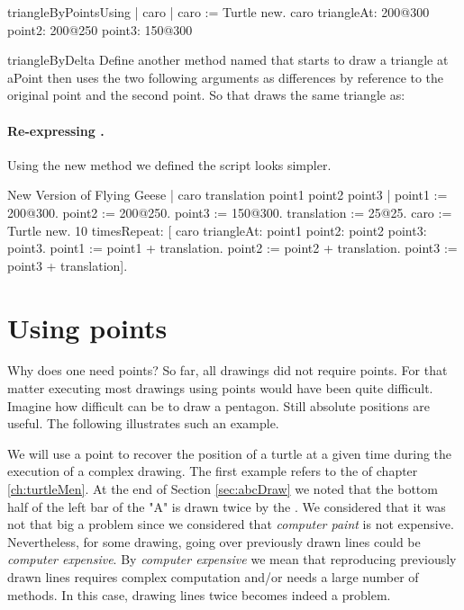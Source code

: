 \begin{scriptfig}{triangleByPoints}{Using }\label{scr:triangleUse}
| caro |
caro := Turtle new.
caro  
   triangleAt: 200@300 
   point2: 200@250 
   point3: 150@300 
\end{scriptfig}

\begin{exofig}{triangleByDelta}
Define another method named  that starts to draw a triangle at aPoint then uses the two following arguments as differences by reference to the original point and the second point.
So that  draws the same triangle as: 
\end{exofig}


\paragraph{Re-expressing .}
Using the new method we defined the script looks simpler. 

\begin{scriptwithtitle}{New Version of Flying Geese}\label{scr:newflyinggeese}
| caro translation point1 point2 point3 |
point1 := 200@300.
point2 := 200@250.
point3 := 150@300.
translation := 25@25.
caro := Turtle new.
10 timesRepeat: [
	caro triangleAt: point1 point2: point2 point3: point3.
       point1 := point1 + translation.
       point2 := point2 + translation.
       point3 := point3 + translation].
\end{scriptwithtitle}



\section{Using points}
Why does one need points? So far, all drawings did not require points. 
For that matter executing most drawings using points
would have been quite difficult. Imagine how difficult can be  to draw a pentagon. 
Still absolute positions are useful. The following illustrates such an example. 

We will use a point to recover the position of a turtle at a given time during the 
execution of a complex drawing. The first example refers to the  of
chapter \ref{ch:turtleMen}. At the end of Section \ref{sec:abcDraw} we noted that the bottom
half of the left bar of the "A" is drawn twice by the 
. We considered that it was not
that big a problem since we considered that \emph{computer
paint} is not expensive. Nevertheless, for some drawing, going
over previously drawn lines could be \emph{computer expensive}. By
\emph{computer expensive} we mean that reproducing previously
drawn lines requires complex computation and/or needs a large
number of methods. In this case, drawing lines twice becomes
indeed a problem.

